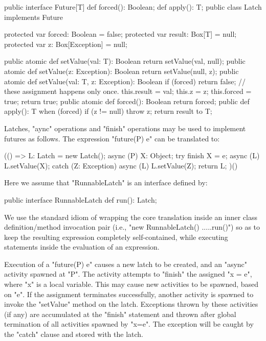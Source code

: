 {{\begin{xten}
public interface Future[T] {
   def forced(): Boolean;
   def apply(): T;
}
public class Latch implements Future {
  protected var forced: Boolean = false;
  protected var result: Box[T] = null;
  protected var z: Box[Exception] = null;

  public atomic def setValue(val: T): Boolean {
    return setValue(val, null);
  }
  public atomic def setValue(z: Exception): Boolean {
    return setValue(null, z);
  }
  public atomic def setValue(val: T,
                             z: Exception): Boolean {
    if (forced) return false;
    // these assignment happens only once.
    this.result = val;
    this.z = z;
    this.forced = true;
    return true;
  }
  public atomic def forced(): Boolean {
    return forced;
  }
  public def apply(): T {
    when (forced) {
      if (z != null) throw z;
      return result to T;
    }
  }
}
\end{xten}

Latches, \xcd"aync" operations and \xcd"finish" operations may be used
to implement futures as follows. The expression \xcd"future(P) e"
can be translated to:
\begin{xten}
(() => {
    L: Latch = new Latch();
    async (P) {
      X: Object;
      try {
        finish X = e;
        async (L) {
          L.setValue(X); 
        }
      }
      catch (Z: Exception) {
        async (L) {
          L.setValue(Z);
        }
      }
    }
    return L;
  })()
\end{xten}

Here we assume that \xcd"RunnableLatch" is an interface defined by:
\begin{xten} 
public interface RunnableLatch {
  def run(): Latch;
}
\end{xten}

We use the standard \java{} idiom of wrapping the core translation
inside an inner class definition/method invocation pair (i.e.,
\xcd"new RunnableLatch() {....}.run()") so as to keep the resulting
expression completely self-contained, while executing statements
inside the evaluation of an expression.

Execution of a \xcd"future(P) e" causes a new latch to be created,
and an \xcd"async" activity spawned at \xcd"P". The activity attempts
to \xcd"finish" the assigned \xcd"x = e", where \xcd"x" is a local
variable.  This may cause new activities to be spawned, based on
\xcd"e". If the assignment terminates successfully, another activity is
spawned to invoke the \xcd"setValue" method on the latch.  Exceptions
thrown by these activities (if any) are accumulated at the \xcd"finish"
statement and thrown after global termination of all
activities spawned by \xcd"x=e". The exception will be caught by the 
\xcd"catch" clause and stored with the latch. 


}}
